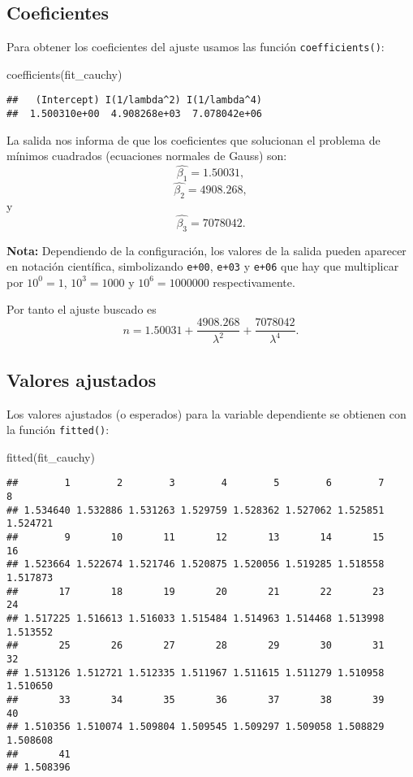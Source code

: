 \documentclass[
  degree=mecinf,
  title=normal,
  toc=normal,
  bib=normal]{mnye}
\newenvironment{Shaded}{\begin{snugshade}}{\end{snugshade}}
\newcommand{\FunctionTok}[1]{\textcolor[rgb]{0.00,0.00,0.00}{#1}}
\newcommand{\NormalTok}[1]{#1}
\begin{document}
\hypertarget{coeficientes}{%
\subsection{Coeficientes}\label{coeficientes}}

Para obtener los coeficientes del ajuste usamos las función \texttt{coefficients()}:

\begin{Shaded}
\begin{Highlighting}[]
\FunctionTok{coefficients}\NormalTok{(fit\_cauchy) }
\end{Highlighting}
\end{Shaded}

\begin{verbatim}
##   (Intercept) I(1/lambda^2) I(1/lambda^4) 
##  1.500310e+00  4.908268e+03  7.078042e+06
\end{verbatim}

La salida nos informa de que los coeficientes que solucionan el problema de mínimos cuadrados (ecuaciones normales de Gauss) son:
\[\hat{\beta_1} = 1.50031,\]
\[\hat{\beta_2} = 4908.268,\]
y
\[\hat{\beta_3} = 7078042.\]

\textbf{Nota:} Dependiendo de la configuración, los valores de la salida pueden aparecer en notación científica, simbolizando \texttt{e+00}, \texttt{e+03} y \texttt{e+06} que hay que multiplicar por \(10^0=1\), \(10^3=1000\) y \(10^6=1000000\) respectivamente.

Por tanto el ajuste buscado es
\[n = 1.50031 + \frac{4908.268}{\lambda^2} + \frac{7078042}{\lambda^4}.\]

\hypertarget{valores-ajustados}{%
\subsection{Valores ajustados}\label{valores-ajustados}}

Los valores ajustados (o esperados) para la variable dependiente se obtienen con la función \texttt{fitted()}:

\begin{Shaded}
\begin{Highlighting}[]
\FunctionTok{fitted}\NormalTok{(fit\_cauchy)}
\end{Highlighting}
\end{Shaded}

\begin{verbatim}
##        1        2        3        4        5        6        7        8 
## 1.534640 1.532886 1.531263 1.529759 1.528362 1.527062 1.525851 1.524721 
##        9       10       11       12       13       14       15       16 
## 1.523664 1.522674 1.521746 1.520875 1.520056 1.519285 1.518558 1.517873 
##       17       18       19       20       21       22       23       24 
## 1.517225 1.516613 1.516033 1.515484 1.514963 1.514468 1.513998 1.513552 
##       25       26       27       28       29       30       31       32 
## 1.513126 1.512721 1.512335 1.511967 1.511615 1.511279 1.510958 1.510650 
##       33       34       35       36       37       38       39       40 
## 1.510356 1.510074 1.509804 1.509545 1.509297 1.509058 1.508829 1.508608 
##       41 
## 1.508396
\end{verbatim}
\end{document}
